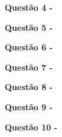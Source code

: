     \vspace{0.5cm}\textbf{Questão 4 -}
    
    \vspace{0.5cm}\textbf{Questão 5 -}
    
    \vspace{0.5cm}\textbf{Questão 6 -}
    
    \vspace{0.5cm}\textbf{Questão 7 -}
    
    \vspace{0.5cm}\textbf{Questão 8 -}
    
    \vspace{0.5cm}\textbf{Questão 9 -}
    
    \vspace{0.5cm}\textbf{Questão 10 -}